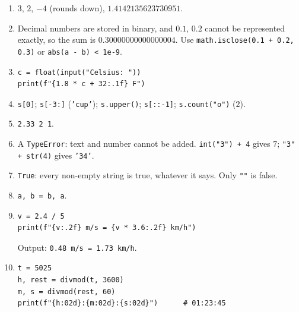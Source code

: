 \begin{enumerate}[label=\textbf{\ansnum.\arabic*}]
  \item $3$, $2$, $-4$ (rounds down), $1.4142135623730951$.
  \item Decimal numbers are stored in binary, and $0.1$, $0.2$ cannot be represented exactly, so the sum is $0.30000000000000004$. Use \verb!math.isclose(0.1 + 0.2, 0.3)! or \verb!abs(a - b) < 1e-9!.
  \item
\begin{verbatim}
c = float(input("Celsius: "))
print(f"{1.8 * c + 32:.1f} F")
\end{verbatim}
  \item \verb!s[0]!; \verb!s[-3:]! (\texttt{'cup'}); \verb!s.upper()!; \verb!s[::-1]!; \verb!s.count("o")! ($2$).
  \item \texttt{2.33 2 1}.
  \item A \texttt{TypeError}: text and number cannot be added. \verb!int("3") + 4! gives $7$; \verb!"3" + str(4)! gives \texttt{'34'}.
  \item \texttt{True}: every non-empty string is true, whatever it says. Only \texttt{""} is false.
  \item \verb!a, b = b, a!.
  \item
\begin{verbatim}
v = 2.4 / 5
print(f"{v:.2f} m/s = {v * 3.6:.2f} km/h")
\end{verbatim}
  Output: \texttt{0.48 m/s = 1.73 km/h}.
  \item[\textbf{\ansnum.10}]
\begin{verbatim}
t = 5025
h, rest = divmod(t, 3600)
m, s = divmod(rest, 60)
print(f"{h:02d}:{m:02d}:{s:02d}")      # 01:23:45
\end{verbatim}
\end{enumerate}
